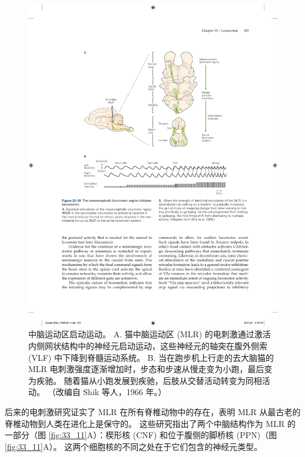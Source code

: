 \begin{figure}[htbp]
	\centering
	\includegraphics[width=0.7\linewidth]{chap33/fig_33_10}
	\caption{中脑运动区启动运动。 A. 猫中脑运动区 (MLR) 的电刺激通过激活内侧网状结构中的神经元启动运动，这些神经元的轴突在腹外侧索 (VLF) 中下降到脊髓运动系统。 B. 当在跑步机上行走的去大脑猫的 MLR 电刺激强度逐渐增加时，步态和步速从慢走变为小跑，最后变为疾驰。 随着猫从小跑发展到疾驰，后肢从交替活动转变为同相活动。 （改编自 Shik 等人，1966 年。）}
	\label{fig:33_10}
\end{figure}

后来的电刺激研究证实了 MLR 在所有脊椎动物中的存在，表明 MLR 从最古老的脊椎动物到人类在进化上是保守的。 
这些研究指出了两个中脑结构作为 MLR 的一部分（图 \ref{fig:33_11}A）：楔形核 (CNF) 和位于腹侧的脚桥核 (PPN)（图 \ref{fig:33_11}A）。 这两个细胞核的不同之处在于它们包含的神经元类型。


